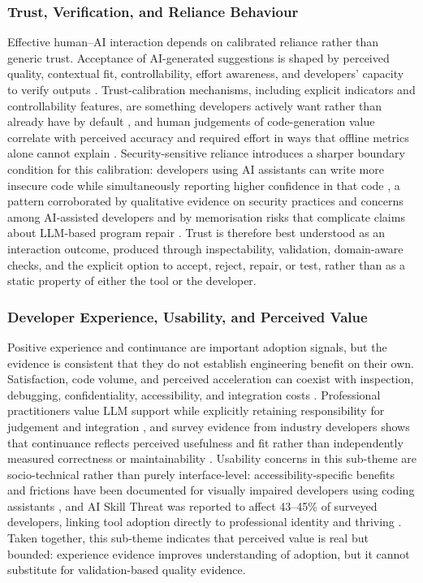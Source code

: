 \subsubsection{Trust, Verification, and Reliance Behaviour}
\label{sec:hai-trust}
Effective human--AI interaction depends on calibrated reliance rather than generic trust. Acceptance of AI-generated suggestions is shaped by perceived quality, contextual fit, controllability, effort awareness, and developers' capacity to verify outputs \cite{brown_identifying_2024,wang_investigating_2024,dibia_aligning_2023}. Trust-calibration mechanisms, including explicit indicators and controllability features, are something developers actively want rather than already have by default \cite{wang_investigating_2024}, and human judgements of code-generation value correlate with perceived accuracy and required effort in ways that offline metrics alone cannot explain \cite{dibia_aligning_2023}. Security-sensitive reliance introduces a sharper boundary condition for this calibration: developers using AI assistants can write more insecure code while simultaneously reporting higher confidence in that code \cite{perry_users_2023}, a pattern corroborated by qualitative evidence on security practices and concerns among AI-assisted developers \cite{klemmer_using_2024} and by memorisation risks that complicate claims about LLM-based program repair \cite{kong_demystifying_2025}. Trust is therefore best understood as an interaction outcome, produced through inspectability, validation, domain-aware checks, and the explicit option to accept, reject, repair, or test, rather than as a static property of either the tool or the developer.

\subsubsection{Developer Experience, Usability, and Perceived Value}
\label{sec:hai-experience}
Positive experience and continuance are important adoption signals, but the evidence is consistent that they do not establish engineering benefit on their own. Satisfaction, code volume, and perceived acceleration can coexist with inspection, debugging, confidentiality, accessibility, and integration costs \cite{santos_model-assisted_2025,park_continuance_2025,mozannar_reading_2024}. Professional practitioners value LLM support while explicitly retaining responsibility for judgement and integration \cite{santos_model-assisted_2025}, and survey evidence from industry developers shows that continuance reflects perceived usefulness and fit rather than independently measured correctness or maintainability \cite{park_continuance_2025}. Usability concerns in this sub-theme are socio-technical rather than purely interface-level: accessibility-specific benefits and frictions have been documented for visually impaired developers using coding assistants \cite{flores-saviaga_impact_2025}, and AI Skill Threat was reported to affect 43--45\% of surveyed developers, linking tool adoption directly to professional identity and thriving \cite{hicks_new_2024}. Taken together, this sub-theme indicates that perceived value is real but bounded: experience evidence improves understanding of adoption, but it cannot substitute for validation-based quality evidence.


